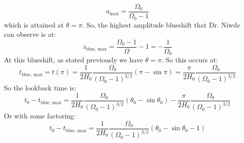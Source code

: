 \begin{equation}
    a_{\text{max}} = \frac{\Omega_0}{\Omega_0 - 1}
\end{equation}
which is attained at $\theta = \pi$. So, the highest amplitude blueshift that Dr. Niwde can observe is at:
\begin{equation}
    \boxed{z_{\text{blue, max}} = \frac{\Omega_0 - 1}{\Omega} - 1 = -\frac{1}{\Omega_0}}
\end{equation}
At this blueshift, as stated previously we have $\theta = \pi$. So this occurs at:
\begin{equation}
    t_{\text{blue, max}} = t(\pi) =  \frac{1}{2H_0}\frac{\Omega_0}{(\Omega_0 - 1)^{3/2}}(\pi - \sin\pi) = \frac{\pi}{2H_0}\frac{\Omega_0}{(\Omega_0 - 1)^{3/2}}
\end{equation}
So the lookback time is:
\begin{equation}
   t_0 -  t_{\text{blue, max}} =  \frac{1}{2H_0}\frac{\Omega_0}{(\Omega_0 - 1)^{3/2}}(\theta_0 - \sin\theta_0) - \frac{\pi}{2H_0}\frac{\Omega_0}{(\Omega_0 - 1)^{3/2}}
\end{equation}
Or with some factoring:
\begin{equation}
    \boxed{t_0 -  t_{\text{blue, max}} = \frac{1}{2H_0}\frac{\Omega_0}{(\Omega_0 - 1)^{3/2}} \left(\theta_0 - \sin\theta_0  - 1\right)}
\end{equation}

